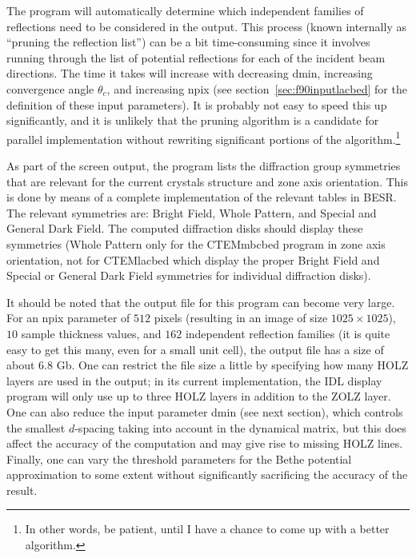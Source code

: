\documentclass[DIV=calc, paper=letter, fontsize=11pt]{scrartcl}	 %
\begin{document}
The program will automatically determine which independent families of reflections need to be considered
in the output.  This process (known internally as ``pruning the reflection list'') can be a bit time-consuming
since it involves running through the list of potential reflections for each of the incident beam directions.
The time it takes will increase with decreasing \textsf{dmin}, increasing convergence angle $\theta_c$, and increasing \textsf{npix} 
(see section~\ref{sec:f90inputlacbed} for the definition of these input parameters).
It is probably not easy to speed this up significantly, and it is unlikely that the pruning algorithm is a 
candidate for parallel implementation without rewriting significant portions of the algorithm.\footnote{In other words,
be patient, until I have a chance to come up with a better algorithm.}

As part of the screen output, the program lists the diffraction group symmetries that are relevant 
for the current crystals structure and zone axis orientation.  This is done by means of a complete 
implementation of the relevant tables in BESR.  The relevant symmetries are:  Bright Field, Whole Pattern, and Special and General
Dark Field.  The computed diffraction disks should display these symmetries (Whole Pattern only for the
\textsf{CTEMmbcbed} program in zone axis orientation, not for \textsf{CTEMlacbed} which display the proper Bright Field
and Special or General Dark Field symmetries for individual diffraction disks).

It should be noted that the output file for this program can become very large.  For an \textsf{npix} parameter 
of $512$ pixels (resulting in an image of size $1025\times 1025$), $10$ sample thickness values,
and $162$ independent reflection families (it is quite easy to get this many, even for a small unit cell),
the output file has a size of about $6.8$ Gb.  One can restrict the file size a little by specifying how  
many HOLZ layers are used in the output; in its current implementation, the IDL display program will only 
use up to three HOLZ layers in addition to the ZOLZ layer.  One can also reduce the input parameter \textsf{dmin} (see next section),
which controls the smallest $d$-spacing taking into account in the dynamical matrix, but this does affect the accuracy 
of the computation and may give rise to missing HOLZ lines.  Finally, one can vary the threshold parameters for the 
Bethe potential approximation to some extent without significantly sacrificing the accuracy of the result.
\end{document}

